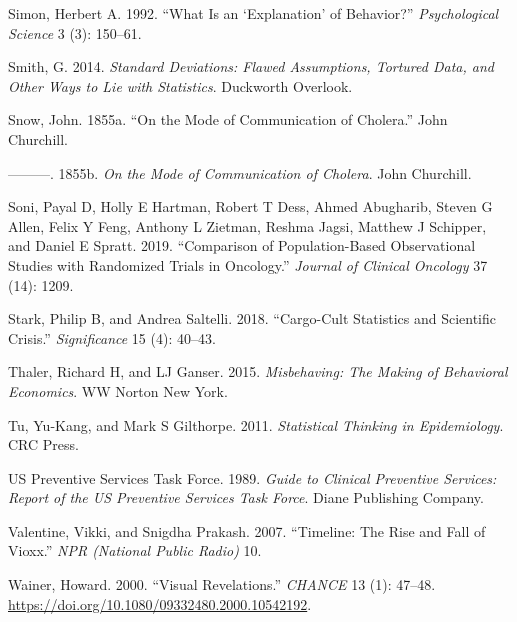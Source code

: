 \documentclass[
  10pt,
  b5paper]{book}
\newlength{\cslhangindent}
\newlength{\cslentryspacingunit} %
\newenvironment{CSLReferences}[2] %
 {%
  \setlength{\parindent}{0pt}
  \ifodd #1
  \let\oldpar\par
  \def\par{\hangindent=\cslhangindent\oldpar}
  \fi
  \setlength{\parskip}{#2\cslentryspacingunit}
 }%
 {}
\begin{document}
\begin{CSLReferences}{1}{0}
\leavevmode{}%
Simon, Herbert A. 1992. {``What Is an {`Explanation'} of Behavior?''} \emph{Psychological Science} 3 (3): 150--61.

\leavevmode{}%
Smith, G. 2014. \emph{Standard Deviations: Flawed Assumptions, Tortured Data, and Other Ways to Lie with Statistics}. Duckworth Overlook.

\leavevmode{}%
Snow, John. 1855a. {``On the Mode of Communication of Cholera.''} John Churchill.

\leavevmode{}%
---------. 1855b. \emph{On the Mode of Communication of Cholera}. John Churchill.

\leavevmode{}%
Soni, Payal D, Holly E Hartman, Robert T Dess, Ahmed Abugharib, Steven G Allen, Felix Y Feng, Anthony L Zietman, Reshma Jagsi, Matthew J Schipper, and Daniel E Spratt. 2019. {``Comparison of Population-Based Observational Studies with Randomized Trials in Oncology.''} \emph{Journal of Clinical Oncology} 37 (14): 1209.

\leavevmode{}%
Stark, Philip B, and Andrea Saltelli. 2018. {``Cargo-Cult Statistics and Scientific Crisis.''} \emph{Significance} 15 (4): 40--43.

\leavevmode{}%
Thaler, Richard H, and LJ Ganser. 2015. \emph{Misbehaving: The Making of Behavioral Economics}. WW Norton New York.

\leavevmode{}%
Tu, Yu-Kang, and Mark S Gilthorpe. 2011. \emph{Statistical Thinking in Epidemiology}. CRC Press.

\leavevmode{}%
US Preventive Services Task Force. 1989. \emph{Guide to Clinical Preventive Services: Report of the US Preventive Services Task Force}. Diane Publishing Company.

\leavevmode{}%
Valentine, Vikki, and Snigdha Prakash. 2007. {``Timeline: The Rise and Fall of Vioxx.''} \emph{NPR (National Public Radio)} 10.

\leavevmode{}%
Wainer, Howard. 2000. {``Visual Revelations.''} \emph{CHANCE} 13 (1): 47--48. \url{https://doi.org/10.1080/09332480.2000.10542192}.


\end{CSLReferences}
\end{document}
